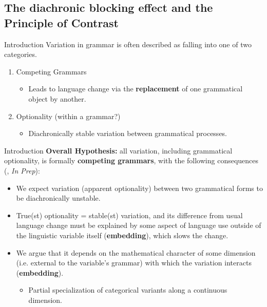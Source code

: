 \documentclass[hyperref={pdfpagelabels=false}]{beamer}
\begin{document}
\subsection{The diachronic blocking effect and the Principle of Contrast}

\begin{frame}{Introduction}
	Variation in grammar is often described as falling into one of two categories.
	
	\begin{enumerate}
		\item Competing Grammars
		\begin{itemize}
			\item Leads to language change via the \textbf{replacement} of one grammatical object by another.
		\end{itemize}
		\item Optionality (within a grammar?)
		\begin{itemize}
			\item Diachronically stable variation between grammatical processes.
		\end{itemize}
	\end{enumerate}
	
\end{frame}


\begin{frame}{Introduction}
	\textbf{Overall Hypothesis:} all variation, including grammatical optionality, is formally \textbf{competing grammars}, with the following consequences (\citealt{fruehwaldwallenberg2013}, \textsl{In Prep}): \nocite{fruehwaldwallenberginprep}
	\begin{itemize}
		\item We expect variation (apparent optionality) between two grammatical forms to be diachronically unstable.
		\item True(st) optionality = stable(st) variation, and its difference from usual language change must be explained by some aspect of language use outside of the linguistic variable itself (\textbf{embedding}), which slows the change. 
		\item We argue that it depends on the mathematical character of some dimension (i.e. external to the variable's grammar) with which the variation interacts (\textbf{embedding}).
			\begin{itemize} \item Partial specialization of categorical variants along a continuous dimension. \end{itemize}
	\end{itemize}

\end{frame}
\end{document}
